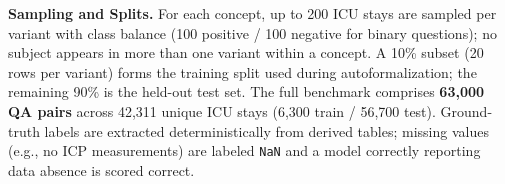 
\textbf{Sampling and Splits.} For each concept, up to 200 ICU stays are sampled per variant with class balance (100 positive / 100 negative for binary questions); no subject appears in more than one variant within a concept. A 10\% subset (20 rows per variant) forms the training split used during autoformalization; the remaining 90\% is the held-out test set. The full benchmark comprises \textbf{63,000 QA pairs} across 42,311 unique ICU stays (6,300 train / 56,700 test). Ground-truth labels are extracted deterministically from derived tables; missing values (e.g., no ICP measurements) are labeled \texttt{NaN} and a model correctly reporting data absence is scored correct.

